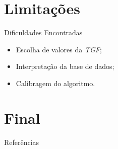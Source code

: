 \documentclass{beamer}
\begin{document}
\section{Limitações}

\begin{frame}{Dificuldades Encontradas}
    
    \begin{itemize}
        \setlength{\itemsep}{10pt}
        \item Escolha de valores da \emph{TGF};
        \item Interpretação da base de dados;
        \item Calibragem do algoritmo.
    \end{itemize}
    
\end{frame}

\section*{Final}

\begin{frame}{Referências}
    \scriptsize
    
\end{frame}
\end{document}
